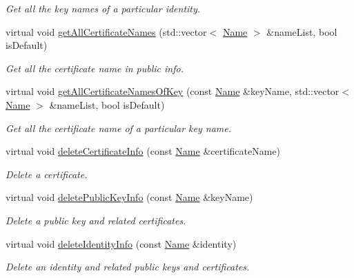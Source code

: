 \begin{DoxyCompactItemize}
\begin{DoxyCompactList}\small\item\em Get all the key names of a particular identity. \end{DoxyCompactList}\item 
virtual void \hyperlink{classndn_1_1security_1_1DummyPublicInfo_a6b5d0ce048e1d79aaf2d3becb683fbb5}{get\+All\+Certificate\+Names} (std\+::vector$<$ \hyperlink{classndn_1_1Name}{Name} $>$ \&name\+List, bool is\+Default)
\begin{DoxyCompactList}\small\item\em Get all the certificate name in public info. \end{DoxyCompactList}\item 
virtual void \hyperlink{classndn_1_1security_1_1DummyPublicInfo_a0b13ea6267bc634e03ce819012219bdb}{get\+All\+Certificate\+Names\+Of\+Key} (const \hyperlink{classndn_1_1Name}{Name} \&key\+Name, std\+::vector$<$ \hyperlink{classndn_1_1Name}{Name} $>$ \&name\+List, bool is\+Default)
\begin{DoxyCompactList}\small\item\em Get all the certificate name of a particular key name. \end{DoxyCompactList}\item 
virtual void \hyperlink{classndn_1_1security_1_1DummyPublicInfo_a7a9eca3523a4f7c9c15011907ce6b5ed}{delete\+Certificate\+Info} (const \hyperlink{classndn_1_1Name}{Name} \&certificate\+Name)
\begin{DoxyCompactList}\small\item\em Delete a certificate. \end{DoxyCompactList}\item 
virtual void \hyperlink{classndn_1_1security_1_1DummyPublicInfo_aae3d4ee3df70a8a00d8e2589be23184d}{delete\+Public\+Key\+Info} (const \hyperlink{classndn_1_1Name}{Name} \&key\+Name)
\begin{DoxyCompactList}\small\item\em Delete a public key and related certificates. \end{DoxyCompactList}\item 
virtual void \hyperlink{classndn_1_1security_1_1DummyPublicInfo_aca6463d9c3804944d7e925bd5fa45086}{delete\+Identity\+Info} (const \hyperlink{classndn_1_1Name}{Name} \&identity)
\begin{DoxyCompactList}\small\item\em Delete an identity and related public keys and certificates. \end{DoxyCompactList}\item 

\end{DoxyCompactItemize}
